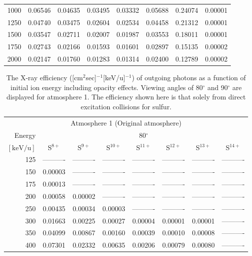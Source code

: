 \begin{table}[ht]
\begin{tabular}{r|c|c|c|c|c|c|c}
     1000 & 0.06546 & 0.04635 & 0.03495 & 0.03332 & 0.05688 & 0.24074 & 0.00001 \\
     1250 & 0.04740 & 0.03475 & 0.02604 & 0.02534 & 0.04458 & 0.21312 & 0.00001 \\
     1500 & 0.03547 & 0.02711 & 0.02007 & 0.01987 & 0.03553 & 0.18011 & 0.00001 \\
     1750 & 0.02743 & 0.02166 & 0.01593 & 0.01601 & 0.02897 & 0.15135 & 0.00002 \\
     2000 & 0.02147 & 0.01760 & 0.01283 & 0.01314 & 0.02400 & 0.12789 & 0.00002 \\ \cline{1-8}
    \end{tabular}
    \label{tab:XRayEffSDE1}
\end{table}

\begin{table}[ht]
    \centering
    \caption{The X-ray efficiency ([cm$^2$sec]$^{-1}$[keV/u]$^{-1}$) of outgoing photons as a function of initial ion energy including opacity effects. Viewing angles of 80$^\circ$ and 90$^\circ$ are displayed for atmosphere 1. The efficiency shown here is that solely from direct excitation collisions for sulfur.}
    \begin{tabular}{r|c|c|c|c|c|c|c}
    \multicolumn{8}{c}{Atmosphere 1 (Original atmosphere)} \\ \cline{2-8}
    Energy & \multicolumn{7}{c}{80$^\circ$} \\ \cline{2-8}
    $\mathrm{[keV/u]}$ & S$^{8+}$ & S$^{9+}$ & S$^{10+}$ & S$^{11+}$ & S$^{12+}$ & S$^{13+}$ & S$^{14+}$ \\ \cline{1-8}
      125 & ---------- & ---------- & ---------- & ---------- & ---------- & ---------- & ---------- \\
      150 & 0.00003 & ---------- & ---------- & ---------- & ---------- & ---------- & ---------- \\
      175 & 0.00013 & ---------- & ---------- & ---------- & ---------- & ---------- & ---------- \\
      200 & 0.00058 & 0.00002 & ---------- & ---------- & ---------- & ---------- & ---------- \\
      250 & 0.00435 & 0.00034 & 0.00003 & ---------- & ---------- & ---------- & ---------- \\
      300 & 0.01663 & 0.00225 & 0.00027 & 0.00004 & 0.00001 & 0.00001 & ---------- \\
      350 & 0.04099 & 0.00867 & 0.00160 & 0.00039 & 0.00010 & 0.00008 & ---------- \\
      400 & 0.07301 & 0.02332 & 0.00635 & 0.00206 & 0.00079 & 0.00080 & ---------- \\

\end{tabular}
\end{table}
